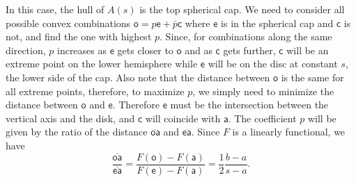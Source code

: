 \documentclass[10pt,twocolumn, nofootinbib]{revtex4-2}
\newcommand{\ens}[1][e] {\mathsf{#1}} %
\begin{document}
In this case, the hull of $A(s)$ is the top spherical cap. We need to consider all possible convex combinations $\ens[o] = p \ens + \bar{p} \ens[c]$ where $\ens$ is in the spherical cap and $\ens[c]$ is not, and find the one with highest $p$. Since, for combinations along the same direction, $p$ increases as $\ens$ gets closer to $\ens[o]$ and as $\ens[c]$ gets further, $\ens[c]$ will be an extreme point on the lower hemisphere while $\ens$ will be on the disc at constant $s$, the lower side of the cap. Also note that the distance between $\ens[o]$ is the same for all extreme points, therefore, to maximize $p$, we simply need to minimize the distance between $\ens[o]$ and $\ens$. Therefore $\ens$ must be the intersection between the vertical axis and the disk, and $\ens[c]$ will coincide with $\ens[a]$. The coefficient $p$ will be given by the ratio of the distance $\overline{\ens[o]\ens[a]}$ and $\overline{\ens\ens[a]}$. Since $F$ is a linearly functional, we have
\begin{equation}
	\frac{\overline{\ens[o]\ens[a]}}{\overline{\ens\ens[a]}} = \frac{F(\ens[o])-F(\ens[a])}{F(\ens) - F(\ens[a])} = \frac{1}{2} \frac{b - a}{s-a}.
\end{equation}
\end{document}
